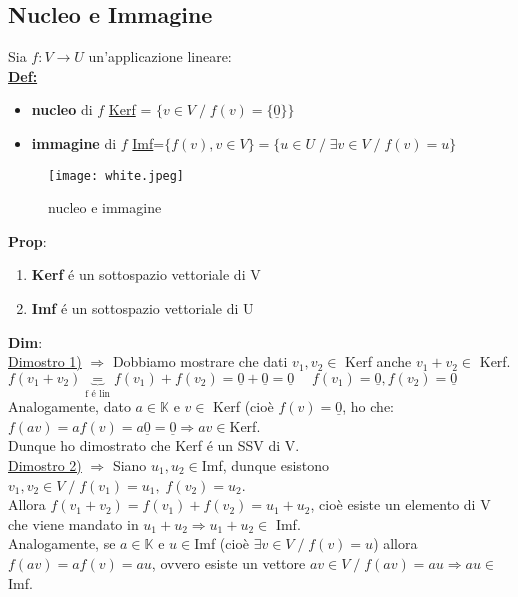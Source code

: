 \documentclass[12pt]{article}
\begin{document}
\subsection{Nucleo e Immagine}
Sia $f: V\longrightarrow U$ un'applicazione lineare:\\
\textbf{\underline{Def:}}
\begin{itemize}
\item \textbf{nucleo} di $f$ \underline{Kerf} = $\{v\in V \;/\; f(v) = \{\underline{0}\}\}$
\item \textbf{immagine} di $f$ \underline {Imf}=$\{f(v),v\in V\} = \{u\in U \;/\; \exists v\in V \;/\; f(v) = u\}$\\
\end{itemize}
\begin{figure}[h!]
        \centering
        \texttt{[image: white.jpeg]}
        \caption{nucleo e immagine}
    \end{figure}
\textbf{Prop}:
\begin{enumerate}
    \item \textbf{Kerf} é un sottospazio vettoriale di V
    \item \textbf{Imf} é un sottospazio vettoriale di U
\end{enumerate}
\textbf{Dim}:\\
\underline{Dimostro 1)} $\Rightarrow$ Dobbiamo mostrare che dati $v_1,v_2 \in$ Kerf anche $v_1+v_2 \in $ Kerf.\\
$f(v_1+v_2) \underbrace{=}_{\text{f é lin}} f(v_1) + f(v_2) = \underline{0}+\underline{0} = \underline{0}\quad \; f(v_1) = \underline{0}, f(v_2) = \underline{0}$\\ 
Analogamente, dato $a \in \mathbb{K}$ e $v\in$ Kerf (cioè $f(v)=\underline{0}$, ho che:\\
$f(av) = af(v) = a\underline{0} = \underline{0}\Longrightarrow av\in $Kerf.\\
Dunque ho dimostrato che Kerf é un SSV di V.\\
\underline{Dimostro 2)} $\Rightarrow$ Siano $u_1,u_2 \in $Imf, dunque esistono $v_1,v_2\in V\;/\; f(v_1) = u_1,\;f(v_2) = u_2$. \\Allora $f(v_1+v_2) = f(v_1)+f(v_2) = u_1+u_2$, cioè esiste un elemento di V che viene mandato in $u_1+u_2 \Longrightarrow u_1+u_2 \in$ Imf.\\
Analogamente, se $a\in \mathbb{K}$ e $u\in$Imf (cioè $\exists v\in V \;/\; f(v) = u$) allora $f(av) = af(v) = au$, ovvero esiste un vettore $av \in V \;/\; f(av) = au\Longrightarrow au \in $Imf.\\
\end{document}
